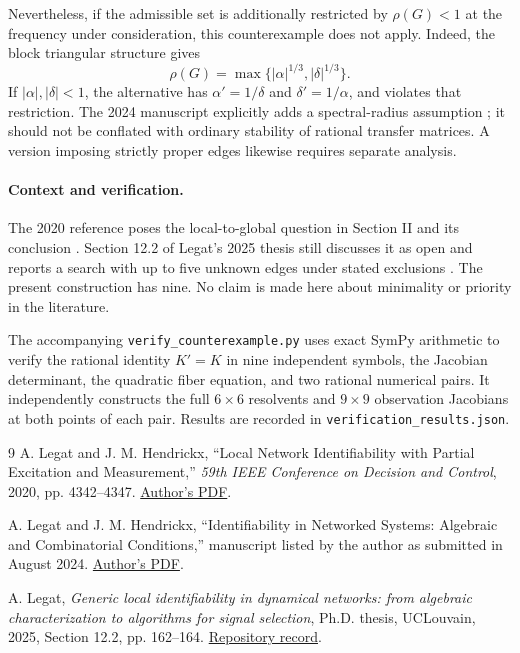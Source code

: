 \documentclass[11pt,a4paper]{article}
\begin{document}
Nevertheless, if the admissible set is additionally restricted by
$\rho(G)<1$ at the frequency under consideration, this counterexample does
not apply. Indeed, the block triangular structure gives
\[
 \rho(G)=\max\{|\alpha|^{1/3},|\delta|^{1/3}\}.
\]
If $|\alpha|,|\delta|<1$, the alternative has $\alpha'=1/\delta$ and
$\delta'=1/\alpha$, and violates that restriction. The 2024 manuscript
explicitly adds a spectral-radius assumption \cite{LH24}; it should not
be conflated with ordinary stability of rational transfer matrices. A
version imposing strictly proper edges likewise requires separate analysis.

\paragraph{Context and verification.}
The 2020 reference poses the local-to-global question in Section II and
its conclusion \cite{LH20}. Section 12.2 of Legat's 2025 thesis still
discusses it as open and reports a search with up to five unknown edges
under stated exclusions \cite{L25}. The present construction has nine.
No claim is made here about minimality or priority in the literature.

The accompanying \texttt{verify\_counterexample.py} uses exact SymPy
arithmetic to verify the rational identity $K'=K$ in nine independent
symbols, the Jacobian determinant, the quadratic fiber equation, and two
rational numerical pairs. It independently constructs the full $6\times6$
resolvents and $9\times9$ observation Jacobians at both points of each pair.
Results are recorded in \texttt{verification\_results.json}.

\begin{thebibliography}{9}
A. Legat and J. M. Hendrickx,
``Local Network Identifiability with Partial Excitation and Measurement,''
\emph{59th IEEE Conference on Decision and Control}, 2020, pp. 4342--4347.
\href{https://perso.uclouvain.be/julien.hendrickx/availablepublications/LH2020_CDC.pdf}{Author's PDF}.

A. Legat and J. M. Hendrickx,
``Identifiability in Networked Systems: Algebraic and Combinatorial
Conditions,'' manuscript listed by the author as submitted in August 2024.
\href{https://perso.uclouvain.be/antoine.legat/_static/TAC24.pdf}{Author's PDF}.

A. Legat, \emph{Generic local identifiability in dynamical networks:
from algebraic characterization to algorithms for signal selection},
Ph.D. thesis, UCLouvain, 2025, Section 12.2, pp. 162--164.
\href{https://hdl.handle.net/2078.5/256546}{Repository record}.
\end{thebibliography}
\end{document}
